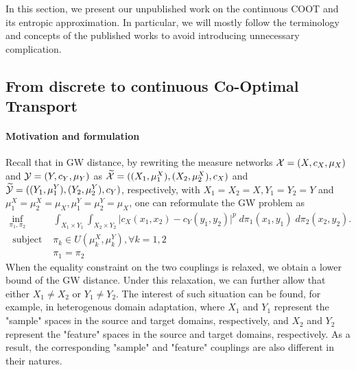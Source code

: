 In this section, we present our unpublished work on the continuous COOT and its entropic approximation.
In particular, we will mostly follow the terminology and concepts of the published works
to avoid introducing unnecessary complication.

\subsection{From discrete to continuous Co-Optimal Transport}

\paragraph{Motivation and formulation} Recall that in GW distance,
by rewriting the measure networks $\mathcal X = (X, c_X, \mu_X)$ and $\mathcal Y = (Y, c_Y, \mu_Y)$ as
$\widetilde{\mathcal X} = ((X_1, \mu_1^X), (X_2, \mu_2^X), c_X)$ and
$\widetilde{\mathcal Y} = ((Y_1, \mu_1^Y), (Y_2, \mu_2^Y), c_Y)$, respectively, with
$X_1 = X_2 = X, Y_1 = Y_2 = Y$ and
$\mu_1^X = \mu^X_2 = \mu_X, \mu_1^Y = \mu^Y_2 = \mu_X$, one can reformulate the GW problem as
\begin{equation}
  \begin{split}
    \inf_{\pi_1, \pi_2}
    &\int_{X_1 \times Y_1} \int_{X_2 \times Y_2}
    \big\vert c_X(x_1, x_2) - c_Y(y_1, y_2) \big\vert^p \; d\pi_1(x_1, y_1) \; d\pi_2(x_2, y_2). \\
    \text{ subject to: } &\pi_k \in U(\mu_k^X, \mu_k^Y), \forall k = 1,2 \\
    &\pi_1 = \pi_2
  \end{split}
\end{equation}
When the equality constraint on the two couplings is relaxed,
we obtain a lower bound of the GW distance. Under this relaxation,
we can further allow that either $X_1 \neq X_2$ or $Y_1 \neq Y_2$.
The interest of such situation can be found, for example, in heterogenous domain adaptation,
where $X_1$ and $Y_1$ represent the "sample" spaces in the source and target domains, respectively,
and $X_2$ and $Y_2$ represent the "feature" spaces in the source and target domains, respectively.
As a result, the corresponding "sample" and "feature" couplings are also different in their natures.

